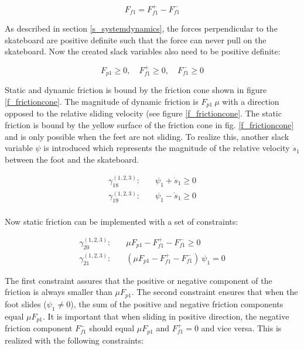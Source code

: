 \documentclass[default,iicol]{sn-jnl}
\theoremstyle{thmstyleone}%
\theoremstyle{thmstyletwo}%
\theoremstyle{thmstylethree}%
\begin{document}
\begin{equation} \label{e_plusminfric}
   F_{f1} = F_{f1}^+ - F_{f1}^-
\end{equation}

As described in section \ref{s_systemdynamics}, the forces perpendicular to the
skateboard are positive definite such that the force can never pull on the
skateboard. Now the created slack variables also need to be positive definite:

\begin{equation}
    F_{p1} \geq 0,\quad F_{f1}^+ \geq 0,\quad F_{f1}^- \geq 0
\end{equation}

Static and dynamic friction is bound by the friction cone shown in figure
\ref{f_frictioncone}. The magnitude of dynamic friction is $F_{p1}\ \mu$ with a
direction opposed to the relative sliding velocity (see figure
\ref{f_frictioncone}. The static friction is bound by the yellow surface of the
friction cone in fig. \ref{f_frictioncone} and is only possible when the feet
are not sliding. To realize this, another slack variable $\psi$ is introduced
which represents the magnitude of the relative velocity $\dot s_1$ between the
foot and the skateboard.

\begin{equation}
\begin{split}
    \gamma_{18}^{(1,2,3)}: \quad & \psi_1 + \dot s_1  \geq 0 \\
    \gamma_{19}^{(1,2,3)}: \quad & \psi_1 - \dot s_1  \geq 0 \\
\end{split}
\end{equation}

Now static friction can be implemented with a set of constraints:

\begin{equation}
\begin{split}\label{e_frictioncontrol}
       \gamma_{20}^{(1,2,3)}: \quad & \mu F_{p1} - F_{f1}^+ - F_{f1}^- \geq 0 \\
       \gamma_{21}^{(1,2,3)}: \quad & (\mu F_{p1} - F_{f1}^+ - F_{f1}^-)\ \psi_1  = 0
\end{split}
\end{equation}

The first constraint assures that the positive or negative component of the
friction is always smaller than $\mu F_{p1}$. The second constraint ensures
that when the foot slides ($\psi_1 \not = 0$),  the sum of the positive and
negative friction components equal $\mu F_{p1}$. It is important that when
sliding in positive direction, the negative friction component $F_{f1}^-$
should equal $\mu F_{p1}$ and $F_{f1}^+=0$ and vice versa. This is realized
with the following constraints:
\end{document}
